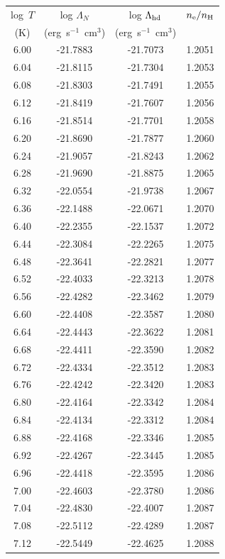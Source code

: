 \documentclass[floatfix,traditabstract,preprint2]{aa}
\begin{document}
\begin{table}[!htbp]
\begin{tabular}{c  c c c}  
log~$T$& log $\Lambda_N$ & log $\Lambda_{\rm hd}$ & $n_{\rm e}/n_{\rm H}$\\
(K) & (erg~s$^{-1}$~cm$^{3}$) & (erg~s$^{-1}$~cm$^{3}$) & \\
\hline
6.00 & -21.7883 & -21.7073 & 1.2051\\
6.04 & -21.8115 & -21.7304 & 1.2053\\
6.08 & -21.8303 & -21.7491 & 1.2055\\
6.12 & -21.8419 & -21.7607 & 1.2056\\
6.16 & -21.8514 & -21.7701 & 1.2058\\
6.20 & -21.8690 & -21.7877 & 1.2060\\
6.24 & -21.9057 & -21.8243 & 1.2062\\
6.28 & -21.9690 & -21.8875 & 1.2065\\
6.32 & -22.0554 & -21.9738 & 1.2067\\
6.36 & -22.1488 & -22.0671 & 1.2070\\
6.40 & -22.2355 & -22.1537 & 1.2072\\
6.44 & -22.3084 & -22.2265 & 1.2075\\
6.48 & -22.3641 & -22.2821 & 1.2077\\
6.52 & -22.4033 & -22.3213 & 1.2078\\
6.56 & -22.4282 & -22.3462 & 1.2079\\
6.60 & -22.4408 & -22.3587 & 1.2080\\
6.64 & -22.4443 & -22.3622 & 1.2081\\
6.68 & -22.4411 & -22.3590 & 1.2082\\
6.72 & -22.4334 & -22.3512 & 1.2083\\
6.76 & -22.4242 & -22.3420 & 1.2083\\
6.80 & -22.4164 & -22.3342 & 1.2084\\
6.84 & -22.4134 & -22.3312 & 1.2084\\
6.88 & -22.4168 & -22.3346 & 1.2085\\
6.92 & -22.4267 & -22.3445 & 1.2085\\
6.96 & -22.4418 & -22.3595 & 1.2086\\
7.00 & -22.4603 & -22.3780 & 1.2086\\
7.04 & -22.4830 & -22.4007 & 1.2087\\
7.08 & -22.5112 & -22.4289 & 1.2087\\
7.12 & -22.5449 & -22.4625 & 1.2088\\

\end{tabular}
\end{table}
\end{document}
